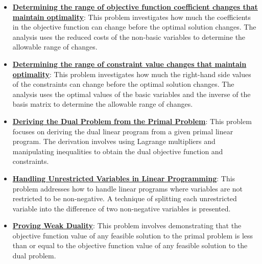 \documentclass{article}%
\begin{document}
\begin{itemize}[leftmargin=*]%
\item \href{https://www.math.purdue.edu/~yipn/421//2024-09-26-Sensitivity.pdf#page=4}{\textbf{Determining the range of objective function coefficient changes that maintain optimality}}: This problem investigates how much the coefficients in the objective function can change before the optimal solution changes.  The analysis uses the reduced costs of the non-basic variables to determine the allowable range of changes.%
\item \href{https://www.math.purdue.edu/~yipn/421//2024-09-26-Sensitivity.pdf#page=8}{\textbf{Determining the range of constraint value changes that maintain optimality}}: This problem investigates how much the right-hand side values of the constraints can change before the optimal solution changes. The analysis uses the optimal values of the basic variables and the inverse of the basis matrix to determine the allowable range of changes.%
\end{itemize}%
\begin{itemize}[leftmargin=*]%
\item \href{https://www.math.purdue.edu/~yipn/421//2024-10-01-DualGeneralLP.pdf#page=1}{\textbf{Deriving the Dual Problem from the Primal Problem}}: This problem focuses on deriving the dual linear program from a given primal linear program.  The derivation involves using Lagrange multipliers and manipulating inequalities to obtain the dual objective function and constraints.%
\item \href{https://www.math.purdue.edu/~yipn/421//2024-10-01-DualGeneralLP.pdf#page=2}{\textbf{Handling Unrestricted Variables in Linear Programming}}: This problem addresses how to handle linear programs where variables are not restricted to be non-negative.  A technique of splitting each unrestricted variable into the difference of two non-negative variables is presented.%
\item \href{https://www.math.purdue.edu/~yipn/421//2024-10-01-DualGeneralLP.pdf#page=5}{\textbf{Proving Weak Duality}}: This problem involves demonstrating that the objective function value of any feasible solution to the primal problem is less than or equal to the objective function value of any feasible solution to the dual problem.%
\end{itemize}%
\end{document}
